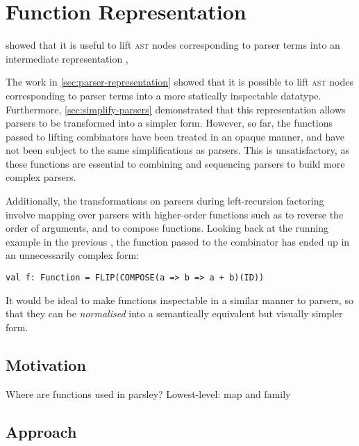 \documentclass[../../main.tex]{subfiles}
\begin{document}
\section{Function Representation}\label{sec:function-representation}

 showed that it is useful to lift \textsc{ast} nodes corresponding to parser terms into an intermediate representation , 

The work in \cref{sec:parser-representation} showed that it is possible to lift \textsc{ast} nodes corresponding to parser terms into a more statically inspectable  datatype.
Furthermore, \cref{sec:simplify-parsers} demonstrated that this representation allows parsers to be transformed into a simpler form.
However, so far, the functions passed to lifting combinators have been treated in an opaque manner, and have not been subject to the same simplifications as parsers.
This is unsatisfactory, as these functions are essential to combining and sequencing parsers to build more complex parsers.

Additionally, the transformations on parsers during left-recursion factoring involve mapping over parsers with higher-order functions such as  to reverse the order of arguments, and  to compose functions.
Looking back at the running example in the previous , the function passed to the  combinator has ended up in an unnecessarily complex form:
\begin{verbatim}
val f: Function = FLIP(COMPOSE(a => b => a + b)(ID))
\end{verbatim}
It would be ideal to make functions inspectable in a similar manner to parsers, so that they can be \emph{normalised} into a semantically equivalent but visually simpler form.

\subsection{Motivation}
Where are functions used in parsley?
Lowest-level: map and family

\subsection{Approach}
\end{document}
